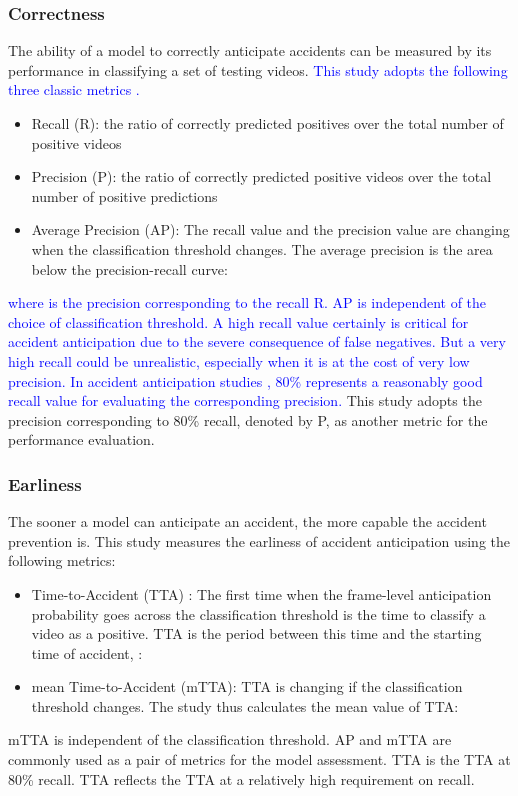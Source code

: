 \documentclass[journal]{IEEEtran}
\begin{document}
\subsubsection{Correctness}
The ability of a model to correctly anticipate accidents can be measured by its performance in classifying a set of testing videos. \textcolor{blue}{This study adopts the following three classic metrics \cite{goodfellow2016deep}.} 
\begin{itemize}
    \item Recall (R): the ratio of correctly predicted positives over the total number of positive videos
\item Precision (P): the ratio of correctly predicted positive videos over the total number of positive predictions
\item Average Precision (AP): The recall value and the precision value are changing when the classification threshold changes. The average precision is the area below the precision-recall curve: 
    
\end{itemize}
\textcolor{blue}{where  is the precision corresponding to the recall R. AP is independent of the choice of classification threshold.
}
\textcolor{blue}{A high recall value certainly is critical for accident anticipation due to the severe consequence of false negatives. But a very high recall could be unrealistic, especially when it is at the cost of very low precision. In accident anticipation studies \cite{chan2016anticipating,bao2020uncertainty}, 80\%  represents a reasonably good recall value for evaluating the corresponding precision.} This study adopts the precision corresponding to 80\% recall, denoted by P, as another metric for the performance evaluation.

\subsubsection{Earliness}
The sooner a model can anticipate an accident, the more capable the accident prevention is. This study measures the earliness of accident anticipation using the following metrics{\cite{chan2016anticipating,bao2020uncertainty,zeng2017agent,suzuki2018anticipating}}:
\begin{itemize}
    \item Time-to-Accident (TTA) : The first time when the frame-level anticipation probability  goes across the classification threshold  is the time to classify a video as a positive. TTA is the period between this time and the starting time of accident, : 
    
    \item mean Time-to-Accident (mTTA): TTA is changing if the classification threshold  changes. The study thus calculates the mean value of TTA: 
    
\end{itemize}
mTTA is independent of the classification threshold. AP and mTTA are commonly used as a pair of metrics for the model assessment. TTA is the TTA at 80\% recall. TTA reflects the TTA at a relatively high requirement on recall.
\end{document}
